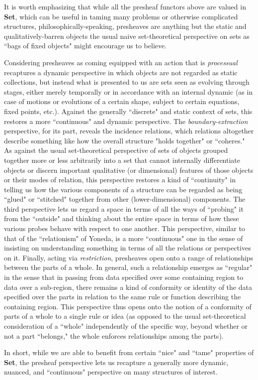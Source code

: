 \documentclass[a4paper]{book}
\theoremstyle{definition}
\theoremstyle{definition}
\theoremstyle{definition}
\theoremstyle{theorem}
\theoremstyle{definition}
\begin{document}
It is worth emphasizing that while all the presheaf functors above are valued in \textbf{Set}, which can be useful in taming many problems or otherwise complicated structures, philosophically-speaking, presheaves are anything but the static and qualitatively-barren objects the usual naive set-theoretical perspective on sets as ``bags of fixed objects" might encourage us to believe. \par 
Considering presheaves as coming equipped with an action that is \textit{processual} recaptures a dynamic perspective in which objects are not regarded as static collections, but instead what is presented to us are sets seen as evolving through stages, either merely temporally or in accordance with an internal dynamic (as in case of motions or evolutions of a certain shape, subject to certain equations, fixed points, etc.). Against the generally ``discrete" and static context of sets, this restores a more ``continuous" and dynamic perspective. The \textit{boundary-extraction} perspective, for its part, reveals the incidence relations, which relations altogether describe something like how the overall structure "holds together" or ``coheres." As against the usual set-theoretical perspective of sets of objects grouped together more or less arbitrarily into a set that cannot internally differentiate objects or discern important qualitative (or dimensional) features of those objects or their modes of relation, this perspective restores a kind of ``continuity" in telling us how the various components of a structure can be regarded as being ``glued" or ``stitched" together from other (lower-dimensional) components. The third perspective lets us regard a space in terms of all the ways of ``probing" it from the ``outside" and thinking about the entire space in terms of how these various probes behave with respect to one another. This perspective, similar to that of the ``relationism" of Yoneda, is a more ``continuous" one in the sense of insisting on understanding something in terms of all the relations or perspectives on it. Finally, acting via \textit{restriction}, presheaves open onto a range of relationships between the parts of a whole. In general, such a relationship emerges as ``regular" in the sense that in passing from data specified over some containing region to data over a sub-region, there remains a kind of conformity or identity of the data specified over the parts in relation to the same rule or function describing the containing region. This perspective thus opens onto the notion of a conformity of parts of a whole to a single rule or idea (as opposed to the usual set-theoretical consideration of a ``whole" independently of the specific way, beyond whether or not a part ``belongs," the whole enforces relationships among the parts). \par 
In short, while we are able to benefit from certain ``nice" and ``tame" properties of \textbf{Set}, the presheaf perspective lets us recapture a generally more dynamic, nuanced, and ``continuous" perspective on many structures of interest.
\end{document}
